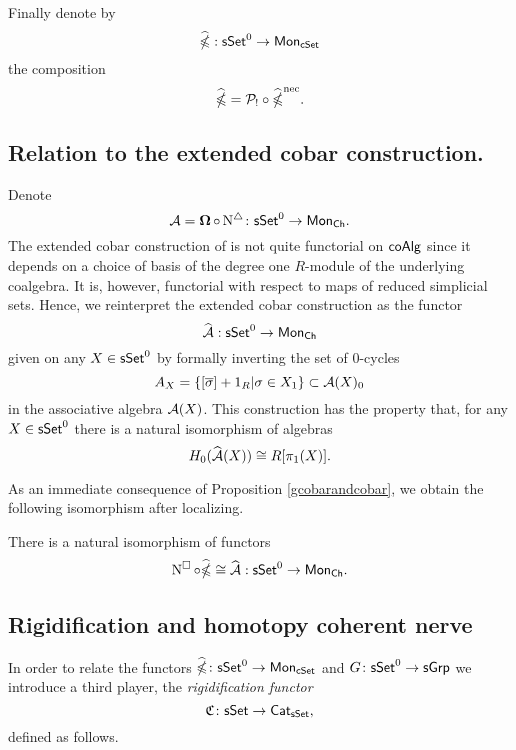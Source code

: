 Finally denote by $$\widehat{\operatorname{\mathbb{\Omega}}}: \mathsf{sSet}^0 \to \mathsf{Mon}_{\mathsf{cSet}}$$ the composition $$\widehat{\operatorname{\mathbb{\Omega}}}= \mathcal{P}_{!} \circ \widehat{\operatorname{\mathbb{\Omega}}}^{\text{nec}}.$$ 

\subsection{Relation to the extended cobar construction.}

Denote $$\operatorname{\mathcal{A}}= \operatorname{\mathbf{\Omega}} \circ \operatorname{N^{\triangle}} \colon \mathsf{sSet}^0 \to \mathsf{Mon}_{\mathsf{Ch}}.$$ The extended cobar construction of \cite{hess2010cobar} is not quite functorial on $\mathsf{coAlg}$ since it depends on a choice of basis of the degree one $R$-module of the underlying coalgebra. It is, however, functorial with respect to maps of reduced simplicial sets. Hence, we reinterpret the extended cobar construction as the functor $$\widehat{\operatorname{\mathcal{A}}}: \mathsf{sSet}^0 \to \mathsf{Mon}_{\mathsf{Ch}}$$
given on any $X \in \mathsf{sSet}^0$ by formally inverting the set of $0$-cycles $$A_X=\{ [\overline{\sigma}]+1_R | \sigma \in X_1 \} \subset \operatorname{\mathcal{A}}(X)_0$$ in the associative algebra $\operatorname{\mathcal{A}}(X)$. This construction has the property that, for any $X \in \mathsf{sSet}^0$ there is a natural isomorphism of algebras $$H_0(\widehat{\operatorname{\mathcal{A}}}(X)) \cong R[\pi_1(X)].$$

As an immediate consequence of Proposition \ref{gcobarandcobar}, we obtain the following isomorphism after localizing.

\begin{corollary}\label{localizedcobar}
There is a natural isomorphism of functors
$$\operatorname{N^{\square}} \circ \widehat{\operatorname{\mathbb{\Omega}}} \cong \widehat{\operatorname{\mathcal{A}}} :\mathsf{sSet}^0 \to \mathsf{Mon}_{\mathsf{Ch}}.$$ 
\end{corollary}





\subsection{Rigidification and homotopy coherent nerve}
In order to relate the functors $\widehat{\operatorname{\mathbb{\Omega}}} \colon \mathsf{sSet}^0 \to \mathsf{Mon}_{\mathsf{cSet}}$ and $G \colon \mathsf{sSet}^0\to \mathsf{sGrp}$ we introduce a third player, the \textit{rigidification functor} $$\mathfrak{C} \colon \mathsf{sSet} \to \mathsf{Cat}_{\mathsf{sSet}}, $$ defined as follows.

